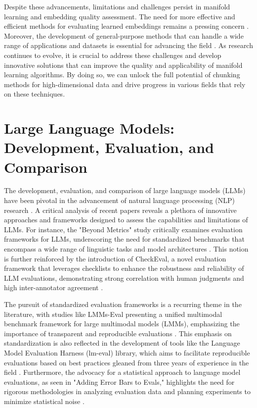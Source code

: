 \documentclass[conference]{IEEEtran}
\begin{document}
Despite these advancements, limitations and challenges persist in manifold learning and embedding quality assessment. The need for more effective and efficient methods for evaluating learned embeddings remains a pressing concern \cite{b1}. Moreover, the development of general-purpose methods that can handle a wide range of applications and datasets is essential for advancing the field \cite{b3}. As research continues to evolve, it is crucial to address these challenges and develop innovative solutions that can improve the quality and applicability of manifold learning algorithms. By doing so, we can unlock the full potential of chunking methods for high-dimensional data and drive progress in various fields that rely on these techniques.

\section{Large Language Models: Development, Evaluation, and Comparison}
The development, evaluation, and comparison of large language models (LLMs) have been pivotal in the advancement of natural language processing (NLP) research \cite{b1}. A critical analysis of recent papers reveals a plethora of innovative approaches and frameworks designed to assess the capabilities and limitations of LLMs. For instance, the "Beyond Metrics" study critically examines evaluation frameworks for LLMs, underscoring the need for standardized benchmarks that encompass a wide range of linguistic tasks and model architectures \cite{b2}. This notion is further reinforced by the introduction of CheckEval, a novel evaluation framework that leverages checklists to enhance the robustness and reliability of LLM evaluations, demonstrating strong correlation with human judgments and high inter-annotator agreement \cite{b3}.

The pursuit of standardized evaluation frameworks is a recurring theme in the literature, with studies like LMMs-Eval presenting a unified multimodal benchmark framework for large multimodal models (LMMs), emphasizing the importance of transparent and reproducible evaluations \cite{b4}. This emphasis on standardization is also reflected in the development of tools like the Language Model Evaluation Harness (lm-eval) library, which aims to facilitate reproducible evaluations based on best practices gleaned from three years of experience in the field \cite{b5}. Furthermore, the advocacy for a statistical approach to language model evaluations, as seen in "Adding Error Bars to Evals," highlights the need for rigorous methodologies in analyzing evaluation data and planning experiments to minimize statistical noise \cite{b6}.
\end{document}
